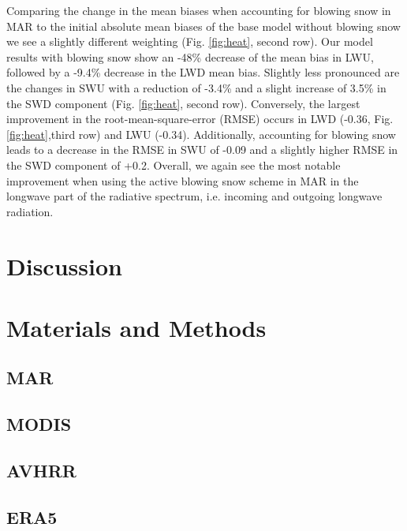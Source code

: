 \documentclass[12pt]{article}
\begin{document}
Comparing the change in the mean biases when accounting for blowing snow in MAR to the initial absolute mean biases of the base model without blowing snow we see a slightly different weighting (Fig. \ref{fig:heat}, second row). Our model results with blowing snow show an -48\% decrease of the mean bias in LWU, followed by a -9.4\% decrease in the LWD mean bias. Slightly less pronounced are the changes in SWU with a reduction of -3.4\% and a slight increase of 3.5\% in the SWD component (Fig. \ref{fig:heat}, second row). Conversely, the largest improvement in the root-mean-square-error (RMSE) occurs in LWD (-0.36, Fig. \ref{fig:heat},third row) and LWU (-0.34).  Additionally, accounting for blowing snow leads to a decrease in the RMSE in SWU of -0.09 and a slightly higher RMSE in the SWD component of +0.2. Overall, we again see the most notable improvement when using the active blowing snow scheme in MAR in the longwave part of the radiative spectrum, i.e. incoming and outgoing longwave radiation.

\section*{Discussion}



\cleardoublepage
\printbibliography[title={Main References}]

\baselineskip24pt
\section*{Materials and Methods}

\subsection*{MAR}

%
\subsection*{MODIS}

\subsection*{AVHRR}

\subsection*{ERA5}
\end{document}
